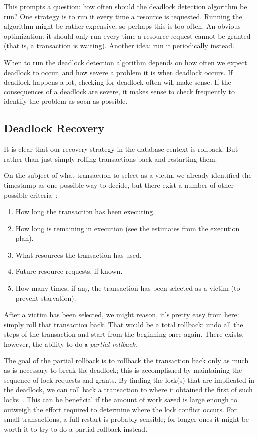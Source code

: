 This prompts a question: how often should the deadlock detection algorithm be run? One strategy is to run it every time a resource is requested. Running the algorithm might be rather expensive, so perhaps this is too often. An obvious optimization: it should only run every time a resource request cannot be granted (that is, a transaction is waiting). Another idea: run it periodically instead.

When to run the deadlock detection algorithm depends on how often we expect deadlock to occur, and how severe a problem it is when deadlock occurs. If deadlock happens a lot, checking for deadlock often will make sense. If the consequences of a deadlock are severe, it makes sense to check frequently to identify the problem as soon as possible.

\subsection*{Deadlock Recovery}

It is clear that our recovery strategy in the database context is rollback. But rather than just simply rolling transactions back and restarting them. 

On the subject of what transaction to select as a victim we already identified the timestamp as one possible way to decide, but there exist a number of other possible criteria~\cite{dsc}:

\begin{enumerate}
\item How long the transaction has been executing.
	\item How long is remaining in execution (see the estimates from the execution plan).
	\item What resources the transaction has used.
	\item Future resource requests, if known.
	\item How many times, if any, the transaction has been selected as a victim (to prevent starvation).
\end{enumerate}

After a victim has been selected, we might reason, it's pretty easy from here: simply roll that transaction back. That would be a total rollback: undo all the steps of the transaction and start from the beginning once again. There exists, however, the ability to do a \textit{partial rollback}. 

The goal of the partial rollback is to rollback the transaction back only as much as is necessary to break the deadlock;  this is accomplished by maintaining the sequence of lock requests and grants. By finding the lock(s) that are implicated in the deadlock, we can roll back a transaction to where it obtained the first of such locks~\cite{dsc}. This can be beneficial if the amount of work saved is large enough to outweigh the effort required to determine where the lock conflict occurs. For small transactions, a full restart is probably sensible; for longer ones it might be worth it to try to do a partial rollback instead.

